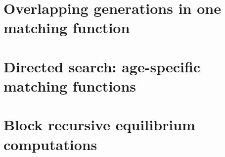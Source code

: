 \section{Overlapping generations in one matching function}


\section{Directed search: age-specific matching functions}


\section{Block recursive equilibrium computations}

